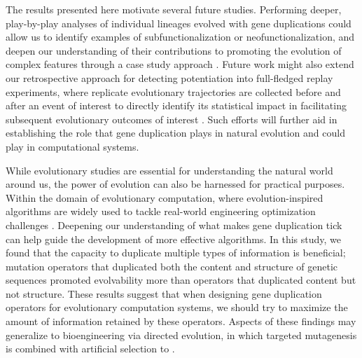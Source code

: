 The results presented here motivate several future studies.
Performing deeper, play-by-play analyses of individual lineages evolved with gene duplications could allow us to identify examples of subfunctionalization or neofunctionalization, and deepen our understanding of  their contributions to promoting the evolution of complex features through a case study approach \citep{mcphee2018detailed}.
Future work might also extend our retrospective approach for detecting potentiation into full-fledged replay experiments, where replicate evolutionary trajectories are collected before and after an event of interest to directly identify its statistical impact in facilitating subsequent evolutionary outcomes of interest \citep{blount2018contingency,Ferguson2023}.
Such efforts will further aid in establishing the role that gene duplication plays in natural evolution and could play in computational systems.

While evolutionary studies are essential for understanding the natural world around us, the power of evolution can also be harnessed for practical purposes.
Within the domain of evolutionary computation, where evolution-inspired algorithms are widely used to tackle real-world engineering optimization challenges \citep{holland1992genetic}.
Deepening our understanding of what makes gene duplication tick can help guide the development of more effective algorithms.
In this study, we found that the capacity to duplicate multiple types of information is beneficial; mutation operators that duplicated both the content and structure of genetic sequences promoted evolvability more than operators that duplicated content but not structure.
These results suggest that when designing gene duplication operators for evolutionary computation systems, we should try to maximize the amount of information retained by these operators.
Aspects of these findings may generalize to bioengineering via directed evolution, in which targeted mutagenesis is combined with artificial selection to \citep{sandberg2019emergence}.

